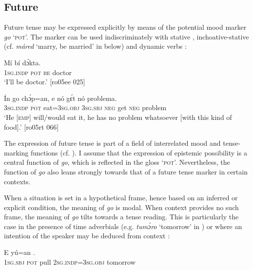 \subsection{Future}\label{sec:6.5.4}

Future tense may be expressed explicitly by means of the potential mood marker \textit{go} \textsc{‘pot’.} The marker can be used indiscriminately with stative , inchoative-stative (cf. \textit{máred} ‘marry, be married’ in  below) and dynamic verbs :


\ea%
    \label{ex:key:386}
    \gll Mí      bí  dɔ́kta.\\
\textsc{1sg.indp}  \textsc{pot}  \textsc{be}  doctor\\

\glt ‘I’ll be doctor.’ [ro05ee 025]
\z


\ea%
    \label{ex:key:387}
    \gll \'{I}n    go  chɔ́p=an,    e    nó  gɛ́t  nó  problema.\\
\textsc{3sg.indp}  \textsc{pot}  eat=\textsc{3sg.obj}  \textsc{3sg.sbj}  \textsc{neg}  get  \textsc{neg}  problem\\

\glt ‘He \textsc{[emp]} will/would eat it, he has no problem whatsoever 
[with this kind of food].’ [ro05rt 066]
\z

The expression of future tense is part of a field of interrelated mood and tense-marking functions (cf. ). I assume that the expression of epistemic possibility is a central function of \textit{go}, which is reflected in the gloss ‘\textsc{pot}’. Nevertheless, the function of \textit{go} also leans strongly towards that of a future tense marker in certain contexts.


When a situation is set in a hypothetical frame, hence based on an inferred or explicit condition, the meaning of \textit{go} is modal. When context provides no such frame, the meaning of \textit{go} tilts towards a tense reading. This is particularly the case in the presence of time adverbials (e.g. \textit{tumɔ́ro} ‘tomorrow’ in ) or where an intention of the speaker may be deduced from context :



\ea%
    \label{ex:key:388}
    \gll E       yú=an      .\\
\textsc{1sg.sbj}  \textsc{pot}  pull  \textsc{2sg.indp}=\textsc{3sg.obj}  tomorrow\\

